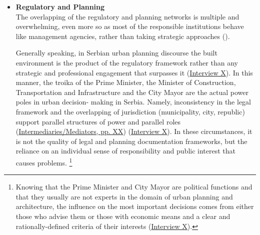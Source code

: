 \documentclass[11pt]{report}
\begin{document}
\begin{itemize}
\item \textbf{Regulatory and Planning}
\\
The overlapping of the regulatory and planning networks is multiple and overwhelming, even more so as most of the responsible institutions behave like management agencies, rather than taking strategic approaches  (\href{Vujosevic}{\citealt{vujosevic_collapse_2010}}).

Generally speaking, in Serbian urban planning discourse the built environment is the product of the regulatory framework rather than any strategic and professional engagement that surpasses it (\href{InterviewX}{Interview X}).
In this manner, the troika of the Prime Minister, the Minister of Construction, Transportation and Infrastructure and the City Mayor are the actual power poles in urban decision- making in Serbia. Namely, inconsistency in the legal framework and the overlapping of jurisdiction (municipality, city, republic) support parallel structures of power and parallel roles (\href{ref}{Intermediaries/Mediators, pp. XX}) (\href{InterviewX}{Interview X}).
In these circumstances, it is not the quality of legal and planning documentation frameworks, but the reliance on an individual sense of responsibility and public interest that causes problems.
\footnote{Knowing that the Prime Minister and City Mayor are political functions and that they usually are not experts in the domain of urban planning and architecture, the influence on the most important decisions comes from either those who advise them or those with economic means and a clear and rationally-defined criteria of their interests 
(\href{InterviewX}{Interview X}).}


\end{itemize}
\end{document}
